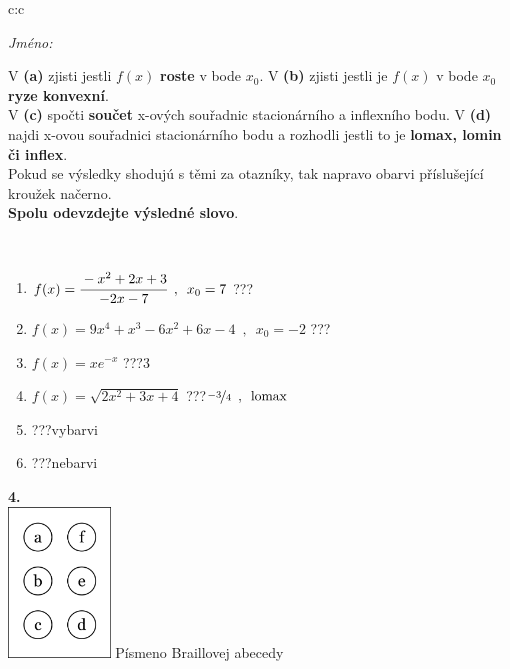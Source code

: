 \documentclass[10pt]{report}
\begin{document}
\begin{tabular}{c:c}
\begin{minipage}[c][104.5mm][t]{0.5\linewidth}
\begin{center}
\textit{Jméno:}\phantom{xxxxxxxxxxxxxxxxxxxxxxxxxxxxxxxxxxxxxxxxxxxxxxxxxxxxxxxxxxxxxxxxx}\\[5mm]
\begin{minipage}{0.95\linewidth}
\begin{center}
{\small V \textbf{(a)} zjisti jestli $f(x)$ \textbf{roste} v bode $x_0$. V \textbf{(b)} zjisti jestli je $f(x)$ v bode $x_0$ \textbf{ryze konvexní}.\\V \textbf{(c)} spočti \textbf{součet} x-ových souřadnic stacionárního a inflexního bodu. V \textbf{(d)} najdi x-ovou souřadnici stacionárního bodu a rozhodli jestli to je \textbf{lomax, lomin či inflex}.\\Pokud se výsledky shodujú s těmi za otazníky, tak napravo obarvi příslušející kroužek načerno.\\\textbf{Spolu odevzdejte výsledné slovo}}.
\end{center}
\end{minipage}
\\[1mm]
\begin{minipage}{0.79\linewidth}
\begin{center}
\begin{varwidth}{\linewidth}
\begin{enumerate}
\normalsize
\item $f(x)=\cfrac{-x^2+2x+3}{-2x-7}\enspace , \enspace x_0=7$\quad \dotfill\; ???\;\dotfill \quad {}
\item $f(x)=9x^4+x^3-6x^2+6x-4\enspace , \enspace x_0=-2$\quad \dotfill\; ???\;\dotfill \quad {}
\item $f(x)=xe^{-x}$\quad \dotfill\; ???\;\dotfill \quad $3$
\item $f(x)=\sqrt{2x^2+3x+4}$\quad \dotfill\; ???\;\dotfill \quad $\nicefrac{-3}{4}\enspace , \enspace\mathrm{lomax}$
\item \quad \dotfill\; ???\;\dotfill \quad vybarvi
\item \quad \dotfill\; ???\;\dotfill \quad nebarvi
\end{enumerate}
\end{varwidth}
\end{center}
\end{minipage}
\begin{minipage}{0.20\linewidth}
\begin{center}
{\Huge\bfseries 4.} \\[2mm]
\includegraphics[height=40mm]{../images/braille.png}
{\small Písmeno Braillovej abecedy}
\end{center}
\end{minipage}
\end{center}
\end{minipage}
%
\end{tabular}
\end{document}
